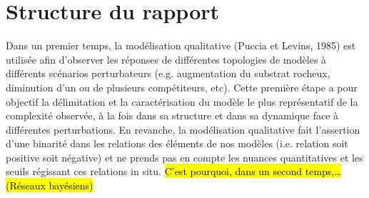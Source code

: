         \section{Structure du rapport}
Dans un premier temps, la modélisation qualitative (Puccia et Levins, 1985) est utilisée afin d’observer les réponses de différentes topologies de modèles à différents scénarios perturbateurs (e.g. augmentation du substrat rocheux, diminution d’un ou de plusieurs compétiteurs, etc). Cette première étape a pour objectif la délimitation et la caractérisation du modèle le plus représentatif de la complexité observée, à la fois dans sa structure et dans sa dynamique face à différentes perturbations. En revanche, la modélisation qualitative fait l’assertion d’une binarité dans les relations des éléments de nos modèles (i.e. relation soit positive soit négative) et ne prends pas en compte les nuances quantitatives et les seuils régissant ces relations in situ. \hl{C’est pourquoi, dans un second temps,…(Réseaux bayésiens)} 
